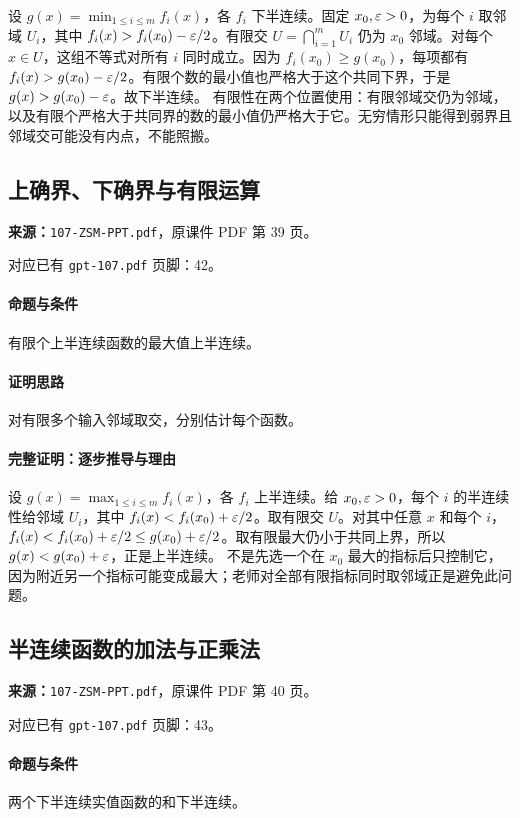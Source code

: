 设 $g(x)=\min_{1\le i\le m}f_i(x)$，各 $f_i$ 下半连续。固定 $x_0,\varepsilon>0$，为每个 $i$ 取邻域 $U_i$，其中 $f_i(x)>f_i(x_0)-\varepsilon/2$。有限交 $U=\bigcap_{i=1}^mU_i$ 仍为 $x_0$ 邻域。对每个 $x\in U$，这组不等式对所有 $i$ 同时成立。因为 $f_i(x_0)\ge g(x_0)$，每项都有 $f_i(x)>g(x_0)-\varepsilon/2$。有限个数的最小值也严格大于这个共同下界，于是 $g(x)>g(x_0)-\varepsilon$。故下半连续。
有限性在两个位置使用：有限邻域交仍为邻域，以及有限个严格大于共同界的数的最小值仍严格大于它。无穷情形只能得到弱界且邻域交可能没有内点，不能照搬。

\clearpage\subsection{上确界、下确界与有限运算}
\textbf{来源：}\texttt{107-ZSM-PPT.pdf}，原课件 PDF 第 39 页。\par
对应已有 \texttt{gpt-107.pdf} 页脚：42。\par
\paragraph{命题与条件}有限个上半连续函数的最大值上半连续。
\paragraph{证明思路}对有限多个输入邻域取交，分别估计每个函数。
\paragraph{完整证明：逐步推导与理由}

设 $g(x)=\max_{1\le i\le m}f_i(x)$，各 $f_i$ 上半连续。给 $x_0,\varepsilon>0$，每个 $i$ 的半连续性给邻域 $U_i$，其中 $f_i(x)<f_i(x_0)+\varepsilon/2$。取有限交 $U$。对其中任意 $x$ 和每个 $i$，$f_i(x)<f_i(x_0)+\varepsilon/2\le g(x_0)+\varepsilon/2$。取有限最大仍小于共同上界，所以 $g(x)<g(x_0)+\varepsilon$，正是上半连续。
不是先选一个在 $x_0$ 最大的指标后只控制它，因为附近另一个指标可能变成最大；老师对全部有限指标同时取邻域正是避免此问题。

\clearpage\subsection{半连续函数的加法与正乘法}
\textbf{来源：}\texttt{107-ZSM-PPT.pdf}，原课件 PDF 第 40 页。\par
对应已有 \texttt{gpt-107.pdf} 页脚：43。\par
\paragraph{命题与条件}两个下半连续实值函数的和下半连续。
